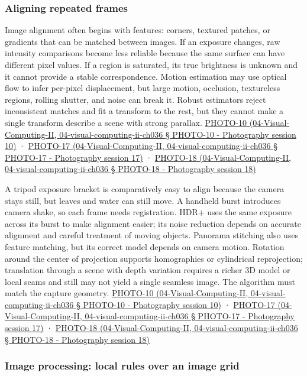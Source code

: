 \subsubsection{Aligning repeated frames}\label{aligning-repeated-frames}

Image alignment often begins with features: corners, textured patches, or gradients that can be matched between images. If an exposure changes, raw intensity comparisons become less reliable because the same surface can have different pixel values. If a region is saturated, its true brightness is unknown and it cannot provide a stable correspondence. Motion estimation may use optical flow to infer per-pixel displacement, but large motion, occlusion, textureless regions, rolling shutter, and noise can break it. Robust estimators reject inconsistent matches and fit a transform to the rest, but they cannot make a single transform describe a scene with strong parallax. \href{}{PHOTO-10 (04-Visual-Computing-II, 04-visual-computing-ii-ch036 § PHOTO-10 - Photography session 10)} · \href{}{PHOTO-17 (04-Visual-Computing-II, 04-visual-computing-ii-ch036 § PHOTO-17 - Photography session 17)} · \href{}{PHOTO-18 (04-Visual-Computing-II, 04-visual-computing-ii-ch036 § PHOTO-18 - Photography session 18)}

A tripod exposure bracket is comparatively easy to align because the camera stays still, but leaves and water can still move. A handheld burst introduces camera shake, so each frame needs registration. HDR+ uses the same exposure across its burst to make alignment easier; its noise reduction depends on accurate alignment and careful treatment of moving objects. Panorama stitching also uses feature matching, but its correct model depends on camera motion. Rotation around the center of projection supports homographies or cylindrical reprojection; translation through a scene with depth variation requires a richer 3D model or local seams and still may not yield a single seamless image. The algorithm must match the capture geometry. \href{}{PHOTO-10 (04-Visual-Computing-II, 04-visual-computing-ii-ch036 § PHOTO-10 - Photography session 10)} · \href{}{PHOTO-17 (04-Visual-Computing-II, 04-visual-computing-ii-ch036 § PHOTO-17 - Photography session 17)} · \href{}{PHOTO-18 (04-Visual-Computing-II, 04-visual-computing-ii-ch036 § PHOTO-18 - Photography session 18)}

\subsubsection{Image processing: local rules over an image grid}\label{image-processing-local-rules-over-an-image-grid}


